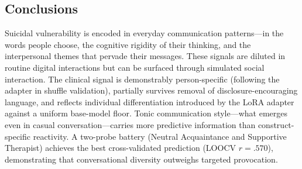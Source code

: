 \documentclass[review,12pt,authoryear]{elsarticle}
\begin{document}
\subsection{Conclusions}

Suicidal vulnerability is encoded in everyday communication patterns---in the words people choose, the cognitive rigidity of their thinking, and the interpersonal themes that pervade their messages. These signals are diluted in routine digital interactions but can be surfaced through simulated social interaction. The clinical signal is demonstrably person-specific (following the adapter in shuffle validation), partially survives removal of disclosure-encouraging language, and reflects individual differentiation introduced by the LoRA adapter against a uniform base-model floor. Tonic communication style---what emerges even in casual conversation---carries more predictive information than construct-specific reactivity. A two-probe battery (Neutral Acquaintance and Supportive Therapist) achieves the best cross-validated prediction (LOOCV $r = .570$), demonstrating that conversational diversity outweighs targeted provocation.
\end{document}
